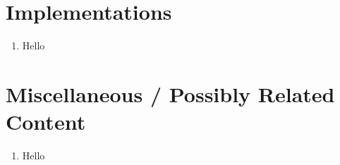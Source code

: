 \documentclass[thesis-solanki.tex]{subfiles}
\begin{document}
\section{Implementations}
\begin{enumerate}
\item Hello
\end{enumerate}

\section{Miscellaneous / Possibly Related Content}
\begin{enumerate}
\item Hello
\end{enumerate}
\end{document}
